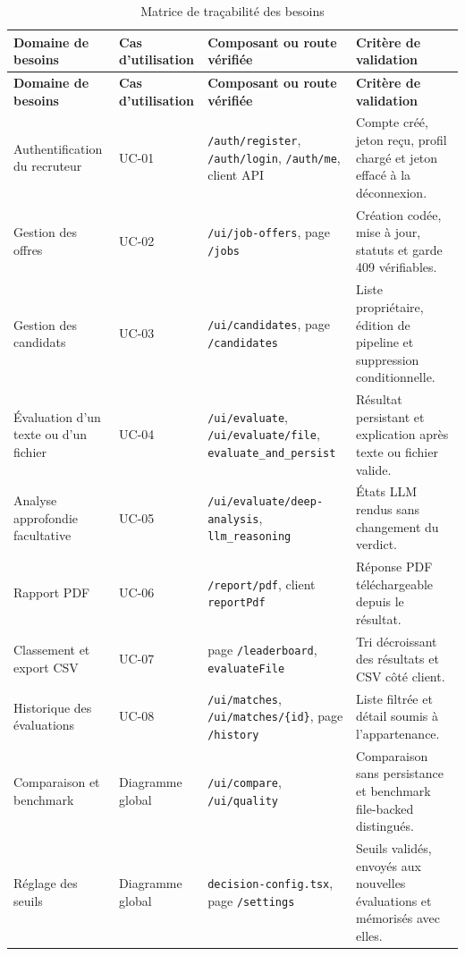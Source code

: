 {\footnotesize\setlength{\tabcolsep}{2pt}
\begin{longtable}{|>{\raggedright\arraybackslash}p{2.9cm}|>{\raggedright\arraybackslash}p{2.0cm}|>{\raggedright\arraybackslash}p{4.25cm}|>{\raggedright\arraybackslash}p{4.3cm}|}
\caption{Matrice de traçabilité des besoins}\label{tab:tracabilite}\\
\hline \textbf{Domaine de besoins} & \textbf{Cas d'utilisation} & \textbf{Composant ou route vérifiée} & \textbf{Critère de validation}\\ \hline
\endfirsthead
\hline \textbf{Domaine de besoins} & \textbf{Cas d'utilisation} & \textbf{Composant ou route vérifiée} & \textbf{Critère de validation}\\ \hline
\endhead
Authentification du recruteur & UC-01 & \texttt{/auth/register}, \texttt{/auth/login}, \texttt{/auth/me}, client API & Compte créé, jeton reçu, profil chargé et jeton effacé à la déconnexion.\\
\hline
Gestion des offres & UC-02 & \texttt{/ui/job-offers}, page \texttt{/jobs} & Création codée, mise à jour, statuts et garde 409 vérifiables.\\
\hline
Gestion des candidats & UC-03 & \texttt{/ui/candidates}, page \texttt{/candidates} & Liste propriétaire, édition de pipeline et suppression conditionnelle.\\
\hline
Évaluation d'un texte ou d'un fichier & UC-04 & \texttt{/ui/evaluate}, \texttt{/ui/evaluate/file}, \texttt{evaluate\_and\_persist} & Résultat persistant et explication après texte ou fichier valide.\\
\hline
Analyse approfondie facultative & UC-05 & \texttt{/ui/evaluate/deep-analysis}, \texttt{llm\_reasoning} & États LLM rendus sans changement du verdict.\\
\hline
Rapport PDF & UC-06 & \texttt{/report/pdf}, client \texttt{reportPdf} & Réponse PDF téléchargeable depuis le résultat.\\
\hline
Classement et export CSV & UC-07 & page \texttt{/leaderboard}, \texttt{evaluateFile} & Tri décroissant des résultats et CSV côté client.\\
\hline
Historique des évaluations & UC-08 & \texttt{/ui/matches}, \texttt{/ui/matches/\{id\}}, page \texttt{/history} & Liste filtrée et détail soumis à l'appartenance.\\
\hline
Comparaison et benchmark & Diagramme global & \texttt{/ui/compare}, \texttt{/ui/quality} & Comparaison sans persistance et benchmark file-backed distingués.\\
\hline
Réglage des seuils & Diagramme global & \texttt{decision-config.tsx}, page \texttt{/settings} & Seuils validés, envoyés aux nouvelles évaluations et mémorisés avec elles.\\
\hline
\end{longtable}\par}
\normalsize

